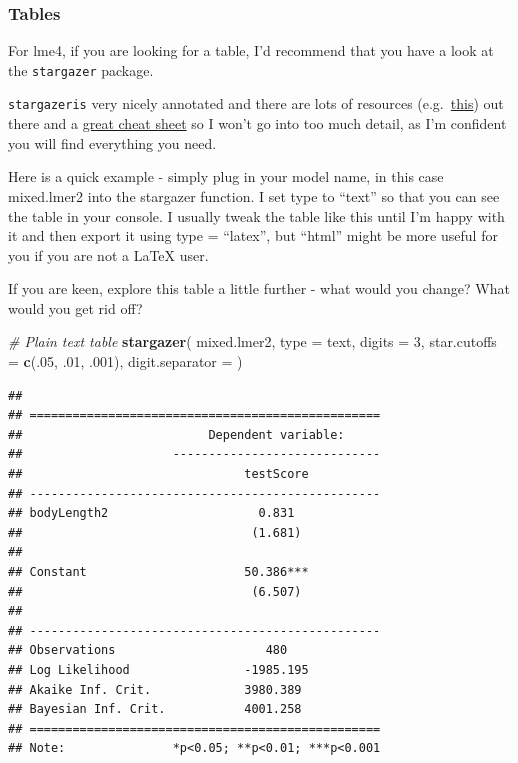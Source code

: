 \documentclass[
]{article}
\newenvironment{Shaded}{\begin{snugshade}}{\end{snugshade}}
\newcommand{\AttributeTok}[1]{\textcolor[rgb]{0.13,0.29,0.53}{#1}}
\newcommand{\CommentTok}[1]{\textcolor[rgb]{0.56,0.35,0.01}{\textit{#1}}}
\newcommand{\DecValTok}[1]{\textcolor[rgb]{0.00,0.00,0.81}{#1}}
\newcommand{\FunctionTok}[1]{\textcolor[rgb]{0.13,0.29,0.53}{\textbf{#1}}}
\newcommand{\NormalTok}[1]{#1}
\newcommand{\StringTok}[1]{\textcolor[rgb]{0.31,0.60,0.02}{#1}}
\begin{document}
\subsubsection{Tables}\label{tables}

For lme4, if you are looking for a table, I'd recommend that you have a
look at the \texttt{stargazer} package.

\texttt{stargazeris} very nicely annotated and there are lots of
resources
(e.g.~\href{https://cran.r-project.org/web/packages/stargazer/vignettes/stargazer.pdf}{this})
out there and a
\href{http://jakeruss.com/cheatsheets/stargazer.html}{great cheat sheet}
so I won't go into too much detail, as I'm confident you will find
everything you need.

Here is a quick example - simply plug in your model name, in this case
mixed.lmer2 into the stargazer function. I set type to ``text'' so that
you can see the table in your console. I usually tweak the table like
this until I'm happy with it and then export it using type = ``latex'',
but ``html'' might be more useful for you if you are not a LaTeX user.

If you are keen, explore this table a little further - what would you
change? What would you get rid off?

\begin{Shaded}
\begin{Highlighting}[]
\CommentTok{\# Plain text table}
\FunctionTok{stargazer}\NormalTok{(}
\NormalTok{  mixed.lmer2,}
  \AttributeTok{type =} \StringTok{\textquotesingle{}text\textquotesingle{}}\NormalTok{,}
  \AttributeTok{digits =} \DecValTok{3}\NormalTok{,}
  \AttributeTok{star.cutoffs =} \FunctionTok{c}\NormalTok{(.}\DecValTok{05}\NormalTok{, .}\DecValTok{01}\NormalTok{, .}\DecValTok{001}\NormalTok{),}
  \AttributeTok{digit.separator =} \StringTok{\textquotesingle{}\textquotesingle{}}
\NormalTok{)}
\end{Highlighting}
\end{Shaded}

\begin{verbatim}
## 
## =================================================
##                          Dependent variable:     
##                     -----------------------------
##                               testScore          
## -------------------------------------------------
## bodyLength2                     0.831            
##                                (1.681)           
##                                                  
## Constant                      50.386***          
##                                (6.507)           
##                                                  
## -------------------------------------------------
## Observations                     480             
## Log Likelihood                -1985.195          
## Akaike Inf. Crit.             3980.389           
## Bayesian Inf. Crit.           4001.258           
## =================================================
## Note:               *p<0.05; **p<0.01; ***p<0.001
\end{verbatim}
\end{document}
